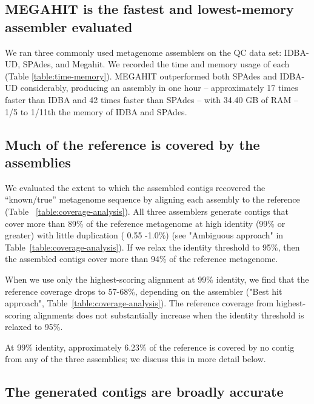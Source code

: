 \documentclass[10pt,a4paper,twocolumn]{article}
\begin{document}
\subsection*{MEGAHIT is the fastest and lowest-memory assembler evaluated}

We ran three commonly used metagenome assemblers on the QC data set:
IDBA-UD, SPAdes, and Megahit. We recorded the time and memory usage of
each (Table \ref{table:time-memory}).  MEGAHIT outperformed both
SPAdes and IDBA-UD considerably, producing an assembly in one hour --
approximately 17 times faster than IDBA and 42 times faster than
SPAdes -- with 34.40 GB of RAM -- 1/5 to 1/11th the memory of IDBA and
SPAdes.
\subsection*{Much of the reference is covered by the assemblies}

We evaluated the extent to which the assembled contigs recovered the
``known/true'' metagenome sequence by aligning each assembly to the
reference (Table ~\ref{table:coverage-analysis}).  All three
assemblers generate contigs that cover more than 89\% of the reference
metagenome at high identity (99\% or greater) with little duplication
( 0.55 -1.0\%) (see "Ambiguous approach" in
Table~\ref{table:coverage-analysis}).  If we relax the identity
threshold to 95\%, then the assembled contigs cover more than 94\% of
the reference metagenome.

When we use only the highest-scoring alignment at 99\% identity, we
find that the reference coverage drops to 57-68\%, depending on the
assembler ("Best hit approach",
Table~\ref{table:coverage-analysis}). The reference coverage from
highest-scoring alignments does not substantially increase when the
identity threshold is relaxed to 95\%.

At 99\% identity, approximately 6.23\% of the reference is covered by
no contig from any of the three assemblies; we discuss this in more
detail below. %

\subsection*{The generated contigs are broadly accurate} 
\end{document}
